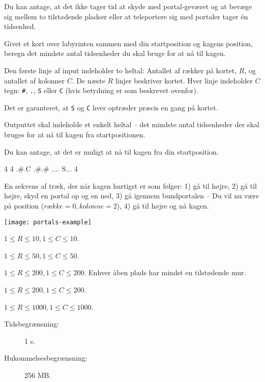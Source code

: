 \documentclass{boi2014-dk}
\newcommand{\constant}[1]{{\tt #1}}
\begin{document}
    Du kan antage, at det ikke tager tid at skyde med portal-geværet og at
    bevæge sig mellem to tilstødende pladser eller at teleportere sig med
    portaler tager én tidsenhed.

    \Task
    Givet et kort over labyrinten sammen med din startposition og kagens
    position, beregn det mindste antal tidsenheder du skal bruge for at nå til
    kagen.

    \Input
    Den første linje af input indeholder to heltal: Antallet af rækker på
    kortet, $R$, og antallet af kolonner $C$. De næste $R$ linjer beskriver
    kortet. Hver linje indeholder $C$ tegn: \constant{\#},
    \constant{.}, \constant{S} eller \constant{C} (hvis betydning er som beskrevet
    ovenfor).

    Det er garanteret, at \constant{S} og \constant{C} hver optræder præcis en
    gang på kortet.

    \Output
    Outputtet skal indeholde et enkelt heltal -- det mindste antal tidsenheder
    der skal bruges for at nå til kagen fra startpositionen.

    Du kan antage, at det er muligt at nå til kagen fra din startposition.

    \Example
    \example
    {
        4 4\newline
        .\#.C\newline
        .\#.\#\newline
        ....\newline
        S...
    }
    {
        4
    }
    {
        En sekvens af træk, der når kagen hurtigst er som følger: 1) gå til
        højre, 2) gå til højre, skyd en portal op og en ned, 3) gå igennem
        bundportalen -- Du vil nu være på position ($række = 0, kolonne = 2$),
        4) gå til højre og nå kagen.

        \begin{center}
            \texttt{[image: portals-example]}
        \end{center}
    }

    \Scoring

    \begin{description}[leftmargin=0pt]
        \item[Delopgave 1 (? point):] $1 \le R \le 10, 1 \le C \le 10$.
        \item[Delopgave 2 (? point):] $1 \le R \le 50, 1 \le C \le 50$.
        \item[Delopgave 3 (? point):] $1 \le R \le 200, 1 \le C \le 200$.
            Enhver åben plads har mindst en tilstødende mur.
        \item[Delopgave 4 (? point):] $1 \le R \le 200, 1 \le C \le 200$.
        \item[Delopgave 5 (? point):] $1 \le R \le 1000, 1 \le C \le 1000$.
    \end{description}

    \Constraints

    \begin{description}
        \item[Tidsbegrænsning:] 1 s.
        \item[Hukommelsesbegrænsning:] 256 MB.
    \end{description}
\end{document}
